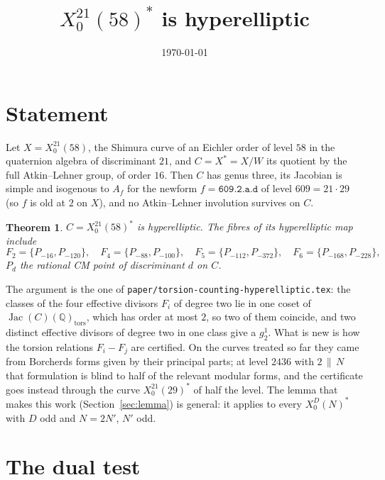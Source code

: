 \documentclass[11pt,reqno]{amsart}
\theoremstyle{plain}
\newtheorem{theorem}{Theorem}[section]
\theoremstyle{definition}
\DeclareMathOperator{\Jac}{Jac}
\newcommand{\Q}{\mathbb{Q}}
\begin{document}
\title{$X_0^{21}(58)^*$ is hyperelliptic}
\author{}
\date{\today}
\maketitle

\section{Statement}

Let $X=X_0^{21}(58)$, the Shimura curve of an Eichler order of level $58$ in the quaternion algebra
of discriminant $21$, and $C=X^*=X/W$ its quotient by the full Atkin--Lehner group, of order $16$.
Then $C$ has genus three, its Jacobian is simple and isogenous to $A_f$ for the newform
$f=\texttt{609.2.a.d}$ of level $609=21\cdot29$ (so $f$ is old at $2$ on $X$), and no Atkin--Lehner
involution survives on $C$.

\begin{theorem}\label{thm:main}
$C=X_0^{21}(58)^*$ is hyperelliptic. The fibres of its hyperelliptic map include
\[
F_2=\{P_{-16},P_{-120}\},\quad F_4=\{P_{-88},P_{-100}\},\quad F_5=\{P_{-112},P_{-372}\},\quad
F_6=\{P_{-168},P_{-228}\},
\]
$P_d$ the rational CM point of discriminant $d$ on $C$.
\end{theorem}

The argument is the one of \texttt{paper/torsion-counting-hyperelliptic.tex}: the classes of the four
effective divisors $F_i$ of degree two lie in one coset of $\Jac(C)(\Q)_{\mathrm{tors}}$, which has
order at most $2$, so two of them coincide, and two distinct effective divisors of degree two in one
class give a $g^1_2$. What is new is how the torsion relations $F_i-F_j$ are certified. On the
curves treated so far they came from Borcherds forms given by their principal parts; at level $2436$
with $2\,\|\,N$ that formulation is blind to half of the relevant modular forms, and the certificate
goes instead through the curve $X_0^{21}(29)^*$ of half the level. The lemma that makes this work
(Section~\ref{sec:lemma}) is general: it applies to every $X_0^D(N)^*$ with $D$ odd and $N=2N'$,
$N'$ odd.

\section{The dual test}\label{sec:dual}
\end{document}
